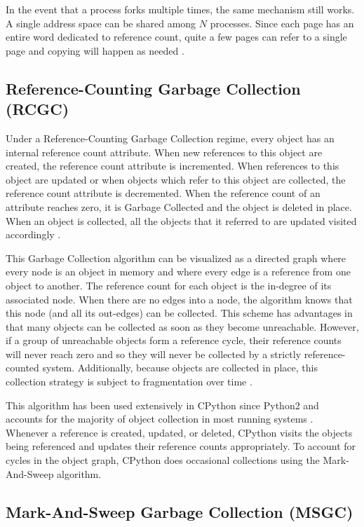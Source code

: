\documentclass{article}
\begin{document}
In the event that a process forks multiple times, the same mechanism still works.  A single address space can be shared among $N$ processes.  Since each page has an entire word dedicated to reference count, quite a few pages can refer to a single page and copying will happen as needed \cite{kernelsource,VMM}.  

\subsection{Reference-Counting Garbage Collection (RCGC)}\label{sec:RCGC}

Under a Reference-Counting Garbage Collection regime, every object has an internal reference count attribute.  When new references to this object are created, the reference count attribute is incremented.  When references to this object are updated or when objects which refer to this object are collected, the reference count attribute is decremented.  When the reference count of an attribute reaches zero, it is Garbage Collected  and the object is deleted in place.  When an object is collected, all the objects that it referred to are updated visited accordingly \cite{GC-continuum}.  

This Garbage Collection algorithm can be visualized as a directed graph where every node is an object in memory and where every edge is a reference from one object to another.  The reference count for each object is the in-degree of its associated node.  When there are no edges into a node, the algorithm knows that this node (and all its out-edges) can be collected.  This scheme has advantages in that many objects can be collected as soon as they become unreachable.  However, if a group of unreachable objects form a reference cycle, their reference counts will never reach zero and so they will never be collected by a strictly reference-counted system.  Additionally, because objects are collected in place, this collection strategy is subject to fragmentation over time \cite{GC-continuum}.  

This algorithm has been used extensively in CPython since Python2 and accounts for the majority of object collection in most running systems \cite{cpython3-doc}.  Whenever a reference is created, updated, or deleted, CPython visits the objects being referenced and updates their reference counts appropriately.  To account for cycles in the object graph, CPython does occasional collections using the Mark-And-Sweep algorithm.  

\subsection{Mark-And-Sweep Garbage Collection (MSGC)}\label{sec:MSGC}
\end{document}
